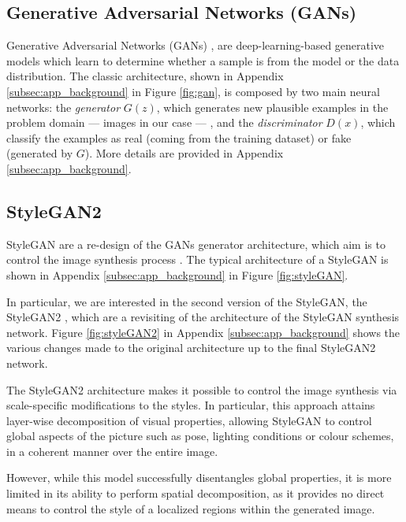 \documentclass{article}
\begin{document}
	\subsection{Generative Adversarial Networks (GANs)}\label{sec:gan}
	Generative Adversarial Networks (GANs) \cite{goodfellow2014generative}, are deep-learning-based 
	generative models which learn to determine whether a sample is from the model or the data 
	distribution. 
	The classic architecture, shown in Appendix \ref{subsec:app_background} in Figure \ref{fig:gan}, is 
	composed by two main neural networks: 
	the \textit{generator} ${G(z)}$, which generates new plausible examples in the problem domain — 
	images in our case — , and the \textit{discriminator} ${D(x)}$, which classify the examples as 
	real (coming from the training dataset) or fake (generated by $G$). More details are provided in 
	Appendix \ref{subsec:app_background}.
	
	\subsection{StyleGAN2}\label{sec:stylegan}
	StyleGAN are a re-design of the GANs generator architecture, which aim is to control the image 
	synthesis process \cite{karras2019style}. The typical architecture of a StyleGAN is shown in 
	Appendix \ref{subsec:app_background} in Figure \ref{fig:styleGAN}.
	
	In particular, we are interested in the second version of the StyleGAN, the StyleGAN2 
	\cite{karras2020analyzing}, which are a revisiting of the architecture of the StyleGAN synthesis 
	network. Figure \ref{fig:styleGAN2} in Appendix \ref{subsec:app_background} shows the various 
	changes made to the original architecture up to the final StyleGAN2 network.
	 
	The StyleGAN2 architecture makes it possible to control the image synthesis via scale-specific 
	modifications to the styles. In particular, this approach attains layer-wise decomposition of visual 
	properties, allowing StyleGAN to control global aspects of the picture such as pose, lighting 
	conditions or colour schemes, in a coherent manner over the entire image.
	
	However, while this model successfully disentangles global properties, it is more limited in its ability 
	to perform spatial decomposition, as it provides no direct means to control the style of a localized 
	regions within the generated image.
\end{document}
